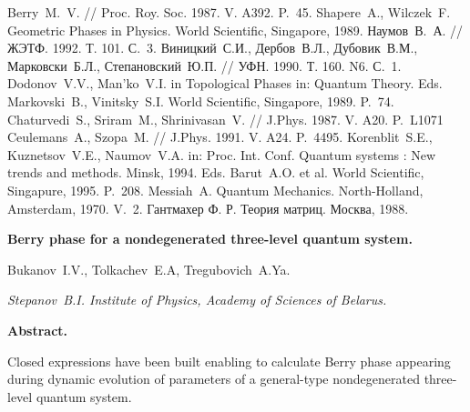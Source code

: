 \documentclass[a4paper]{article}
\begin{document}
\begin{thebibliography}{10}

  Berry~M.~V. // Proc. Roy. Soc. 1987. V. A392. P.~45.
  Shapere~A., Wilczek~F. Geometric Phases in Physics. World Scientific,
  Singapore, 1989.
  Наумов~В.~А. // ЖЭТФ. 1992. Т. 101. С.~3.
  Виницкий~С.И., Дербов~В.Л., Дубовик~В.М., Марковски~Б.Л., 
Степановский~Ю.П.
  // УФН. 1990. Т. 160. N6. С.~1.
  Dodonov~V.V., Man'ko~V.I. in Topological Phases in: Quantum Theory.
  Eds. Markovski~B., Vinitsky~S.I. World Scientific, Singapore, 1989. P.~74.
  Chaturvedi~S., Sriram~M., Shrinivasan~V. // J.Phys. 1987. V. A20. P.~L1071
  Ceulemans~A., Szopa~M. // J.Phys. 1991. V. A24. P.~4495.
  Korenblit~S.E., Kuznetsov~V.E., Naumov~V.A. in: Proc. Int. Conf.
  Quantum systems : New trends and methods. Minsk, 1994.
  Eds. Barut~A.O. et al. World Scientific, Singapure, 1995. P.~208.
  Messiah~A. Quantum Mechanics. North-Holland, Amsterdam, 1970. V.~2.
  Гантмахер Ф. Р. Теория матриц. Москва, 1988.
\end{thebibliography}

\pagebreak

\begin{center}

{\large\bf Berry phase for a nondegenerated three-level quantum system. }

Bukanov~I.V., Tolkachev~E.A, Tregubovich~A.Ya.

{\it Stepanov~B.I. Institute of Physics, Academy of Sciences of Belarus.}

\end{center}

\begin{center}
{\bf Abstract. }
\end{center}

\begin{center}
  Closed expressions have been built enabling to calculate Berry phase
  appearing during dynamic evolution of parameters
  of a general-type nondegenerated three-level quantum system.

\end{center}
\end{document}
